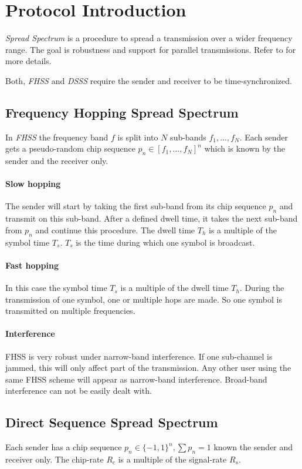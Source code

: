 \section{Protocol Introduction}
\label{sec:theory}
	\emph{Spread  Spectrum} is a procedure to spread a transmission over a wider frequency range. The goal is robustness and support for parallel transmissions.
	Refer to \cite{ISS} for more details.
	
	Both, \emph{FHSS} and \emph{DSSS} require the sender and receiver to be time-synchronized. 
	
	\subsection{Frequency Hopping Spread Spectrum}
		In \emph{FHSS} the frequency band $f$ is split into $N$ sub-bands $f_1,..., f_N$. Each sender gets a pseudo-random chip sequence $p_n \in [f_1,...,f_N]^n$ which is known by the sender and the receiver only.
		
		\paragraph{Slow hopping} The sender will start by taking the first sub-band from its chip sequence $p_n$ and transmit on this sub-band.
		After a defined dwell time, it takes the next sub-band from $p_n$ and continue this procedure. The dwell time $T_h$ is a multiple of the symbol time $T_s$. $T_s$ is the time during which one symbol is broadcast.
		
		\paragraph{Fast hopping} In this case the symbol time $T_s$ is a multiple of the dwell time $T_h$. During the transmission of one symbol, one or multiple hops are made. So one symbol is transmitted on multiple frequencies.
		
		\paragraph{Interference} FHSS is very robust under narrow-band interference. If one sub-channel is jammed, this will only affect part of the transmission. Any other user using the same FHSS scheme will appear as narrow-band interference.
		Broad-band interference can not be easily dealt with.
		
	
	\subsection{Direct Sequence Spread Spectrum}
		Each sender has a chip sequence $p_n \in \{-1,1\}^n, \sum p_n = 1$ known the sender and receiver only. The chip-rate $R_c$ is a multiple of the signal-rate $R_s$.
		
